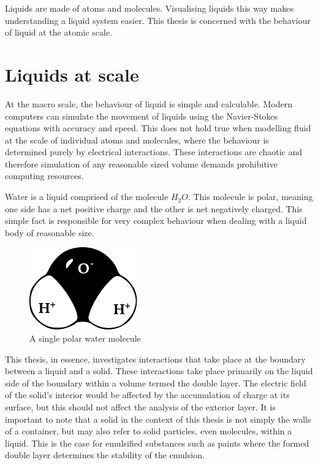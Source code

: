
Liquids are made of atoms and molecules. Visualising liquids this way makes understanding a liquid system easier. This thesis is concerned with the behaviour of liquid at the atomic scale.

\section{Liquids at scale}
At the macro scale, the behaviour of liquid is simple and calculable. Modern computers can simulate the movement of liquids using the Navier-Stokes equations with accuracy and speed. This does not hold true when modelling fluid at the scale of individual atoms and molecules, where the behaviour is determined purely by electrical interactions. These interactions are chaotic and therefore simulation of any reasonable sized volume demands prohibitive computing resources.

Water is a liquid comprised of the molecule $H_{2}O$. This molecule is polar, meaning one side has a net positive charge and the other is net negatively charged. This simple fact is responsible for very complex behaviour when dealing with a liquid body of reasonable size.

\begin{figure}
    \begin{center}
        \includegraphics{content/introduction/graphics/polarWater}
    \end{center}
    \caption{A single polar water molecule}
    \label{fig:waterMolecule}
\end{figure}

This thesis, in essence, investigates interactions that take place at the boundary between a liquid and a solid. These interactions take place primarily on the liquid side of the boundary within a volume termed the double layer. The electric field of the solid's interior would be affected by the accumulation of charge at its surface, but this should not affect the analysis of the exterior layer. It is important to note that a solid in the context of this thesis is not simply the walls of a container, but may also refer to solid particles, even molecules, within a liquid. This is the case for emulsified substances such as paints where the formed double layer determines the stability of the emulsion.

